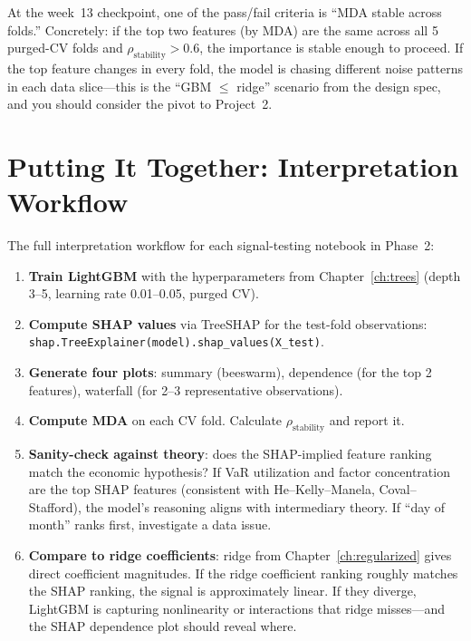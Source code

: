 \begin{projectconnection}
At the week~13 checkpoint, one of the pass/fail criteria is ``MDA stable across folds.''
Concretely: if the top two features (by MDA) are the same across all 5 purged-CV folds and $\rho_{\mathrm{stability}} > 0.6$, the importance is stable enough to proceed.
If the top feature changes in every fold, the model is chasing different noise patterns in each data slice---this is the ``GBM $\leq$ ridge'' scenario from the design spec, and you should consider the pivot to Project~2.
\end{projectconnection}

\section{Putting It Together: Interpretation Workflow}
\label{sec:interpretation-workflow}

The full interpretation workflow for each signal-testing notebook in Phase~2:

\begin{enumerate}[nosep]
  \item \textbf{Train LightGBM} with the hyperparameters from Chapter~\ref{ch:trees} (depth 3--5, learning rate 0.01--0.05, purged CV).
  \item \textbf{Compute SHAP values} via TreeSHAP for the test-fold observations: \texttt{shap.TreeExplainer(model).shap\_values(X\_test)}.
  \item \textbf{Generate four plots}: summary (beeswarm), dependence (for the top 2 features), waterfall (for 2--3 representative observations).
  \item \textbf{Compute MDA} on each CV fold. Calculate $\rho_{\mathrm{stability}}$ and report it.
  \item \textbf{Sanity-check against theory}: does the SHAP-implied feature ranking match the economic hypothesis? If VaR utilization and factor concentration are the top SHAP features (consistent with He--Kelly--Manela, Coval--Stafford), the model's reasoning aligns with intermediary theory. If ``day of month'' ranks first, investigate a data issue.
  \item \textbf{Compare to ridge coefficients}: ridge from Chapter~\ref{ch:regularized} gives direct coefficient magnitudes. If the ridge coefficient ranking roughly matches the SHAP ranking, the signal is approximately linear. If they diverge, LightGBM is capturing nonlinearity or interactions that ridge misses---and the SHAP dependence plot should reveal where.
\end{enumerate}

